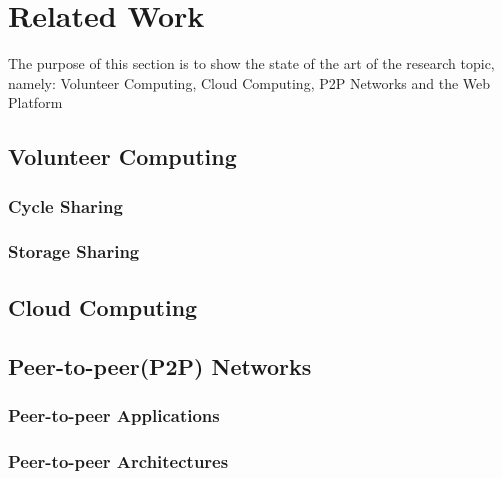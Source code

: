 % 
% 

\section{Related Work}
The purpose of this section is to show the state of the art of the research topic, namely: Volunteer Computing, Cloud Computing, P2P Networks and the Web Platform



\subsection{Volunteer Computing}


\subsubsection{Cycle Sharing}

\subsubsection{Storage Sharing}


\subsection{Cloud Computing}



\subsection{Peer-to-peer(P2P) Networks}

\subsubsection{Peer-to-peer Applications}

\subsubsection{Peer-to-peer Architectures}

